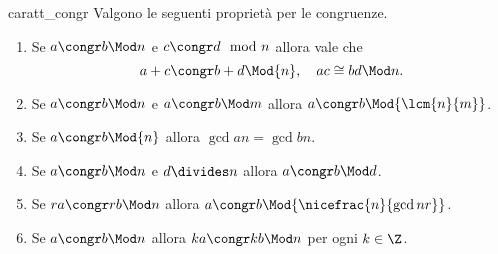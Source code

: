 \begin{proposition}{caratt_congr}
    Valgono le seguenti proprietà per le congruenze.
    \begin{enumerate}[label={(\arabic*)}]
        \item Se $a \congr b \Mod n$ e $c \congr d \mod n$ allora vale che \[
            a+c \congr b + d \Mod{n}, \quad ac \cong bd \Mod n.   
        \]
        \item Se $a \congr b \Mod n$ e $a \congr b \Mod m$ allora $a \congr b \Mod{\lcm{n}{m}}$.
        \item Se $a \congr b \Mod{n}$ allora $\gcd{a}{n} = \gcd{b}{n}$.
        \item Se $a \congr b \Mod n$ e $d \divides n$ allora $a \congr b \Mod d$.
        \item Se $ra \congr rb \Mod n$ allora $a \congr b \Mod{\nicefrac{n}{\gcd{n}{r}}}$.
        \item Se $a \congr b \Mod n$ allora $ka \congr kb \Mod n$ per ogni $k \in \Z$.
    \end{enumerate}
\end{proposition}
